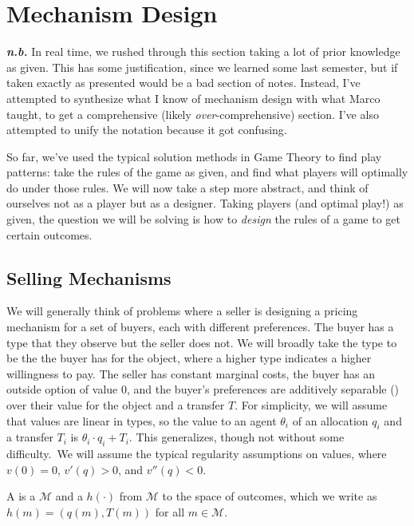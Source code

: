 \documentclass[10pt]{article}
\begin{document}
\section{Mechanism Design}


\textbf{\textit{n.b.}} In real time, we rushed through this section taking a lot of prior knowledge as given. This has some justification, since we learned some last semester, but if taken exactly as presented would be a bad section of notes. Instead, I've attempted to synthesize what I know of mechanism design with what Marco taught, to get a comprehensive (likely \emph{over}-comprehensive) section. I've also attempted to unify the notation because it got confusing. 


\begin{remark}
	So far, we've used the typical solution methods in Game Theory to find play patterns: take the rules of the game as given, and find what players will optimally do under those rules. We will now take a step more abstract, and think of ourselves not as a player but as a designer. Taking players (and optimal play!) as given, the question we will be solving is how to \emph{design} the rules of a game to get certain outcomes.
\end{remark}

\subsection{Selling Mechanisms}

\begin{model}
	We will generally think of problems where a seller is designing a pricing mechanism for a set of buyers, each with different preferences. The buyer has a type that they observe but the seller does not. We will broadly take the type to be the  the buyer has for the object, where a higher type indicates a higher willingness to pay. The seller has constant marginal costs, the buyer has an outside option of value 0, and the buyer's preferences are additively separable () over their value for the object and a transfer $T$. For simplicity, we will assume that values are linear in types, so the value to an agent $\theta_i$ of an allocation $q_i$ and a transfer $T_i$ is $\theta_i \cdot q_i + T_i$. This generalizes, though not without some difficulty. We will assume the typical regularity assumptions on values, where $v(0) = 0$, $v'(q) > 0$, and $v''(q) < 0$.
\end{model}

\begin{definition}
	A  is a  $\mathcal{M}$ and a  $h(\cdot)$ from $\mathcal{M}$ to the space of outcomes, which we write as $h(m) = (q(m),T(m))$ for all $m \in \mathcal{M}$. 
\end{definition}
\end{document}
